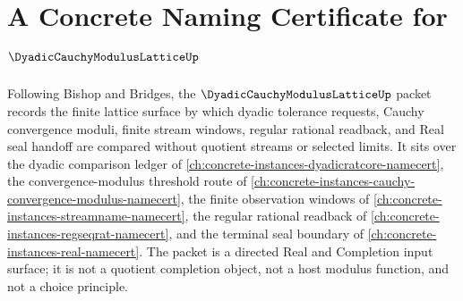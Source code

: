\chapter{A Concrete Naming Certificate for $\DyadicCauchyModulusLatticeUp$}
\label{ch:concrete-instances-dyadic-cauchy-modulus-lattice-namecert}

Following Bishop and Bridges, the $\DyadicCauchyModulusLatticeUp$ packet records the finite lattice surface by which dyadic tolerance requests, Cauchy convergence moduli, finite stream windows, regular rational readback, and Real seal handoff are compared without quotient streams or selected limits. It sits over the dyadic comparison ledger of \autoref{ch:concrete-instances-dyadicratcore-namecert}, the convergence-modulus threshold route of \autoref{ch:concrete-instances-cauchy-convergence-modulus-namecert}, the finite observation windows of \autoref{ch:concrete-instances-streamname-namecert}, the regular rational readback of \autoref{ch:concrete-instances-regseqrat-namecert}, and the terminal seal boundary of \autoref{ch:concrete-instances-real-namecert}. The packet is a directed Real and Completion input surface; it is not a quotient completion object, not a host modulus function, and not a choice principle.

